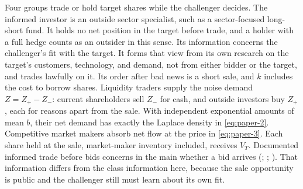 
Four groups trade or hold target shares while the challenger decides.
The informed investor is an outside sector specialist, such as a
sector-focused long-short fund. It holds no net position in the target
before trade, and a holder with a full hedge counts as an outsider in
this sense. Its information concerns the challenger's fit with the
target. It forms that view from its own research on the target's
customers, technology, and demand, not from either bidder or the
target, and trades lawfully on it. Its order after bad news is a short
sale, and \(k\) includes the cost to borrow shares. Liquidity traders
supply the noise demand \(Z=Z_+-Z_-\): current shareholders sell
\(Z_-\) for cash, and outside investors buy \(Z_+\), each for reasons
apart from the sale. With independent exponential amounts of mean
\(b\), their net demand has exactly the Laplace density in
\eqref{eq:paper-2}. Competitive market makers absorb net flow at the
price in \eqref{eq:paper-3}. Each share held at the sale, market-maker
inventory included, receives \(V_T\). Documented informed trade before
bids concerns in the main whether a bid arrives
(;
;
). That
information differs from the class information here, because the sale
opportunity is public and the challenger still must learn about its
own fit.
